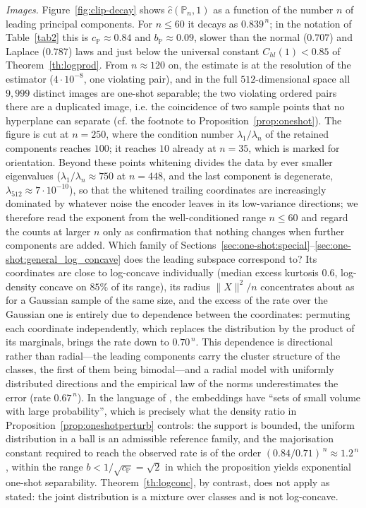 {\it Images.} Figure~\ref{fig:clip-decay} shows $\hat c({\mathbb P}_n,1)$ as a function of the number $n$ of leading principal components. For $n\le60$ it decays as $0.839^{\,n}$; in the notation of Table~\ref{tab2} this is $c_{\mathbb P}\approx0.84$ and $b_{\mathbb P}\approx0.09$, slower than the normal ($0.707$) and Laplace ($0.787$) laws and just below the universal constant $C_{hl}(1)<0.85$ of Theorem~\ref{th:logprod}. From $n\approx120$ on, the estimate is at the resolution of the estimator ($4\cdot10^{-8}$, one violating pair), and in the full $512$-dimensional space all $9{,}999$ distinct images are one-shot separable; the two violating ordered pairs there are a duplicated image, i.e. the coincidence of two sample points that no hyperplane can separate (cf. the footnote to Proposition~\ref{prop:oneshot}). The figure is cut at $n=250$, where the condition number $\lambda_1/\lambda_n$ of the retained components reaches $100$; it reaches $10$ already at $n=35$, which is marked for orientation. Beyond these points whitening divides the data by ever smaller eigenvalues ($\lambda_1/\lambda_n\approx750$ at $n=448$, and the last component is degenerate, $\lambda_{512}\approx7\cdot10^{-10}$), so that the whitened trailing coordinates are increasingly dominated by whatever noise the encoder leaves in its low-variance directions; we therefore read the exponent from the well-conditioned range $n\le60$ and regard the counts at larger $n$ only as confirmation that nothing changes when further components are added. Which family of Sections~\ref{sec:one-shot:special}--\ref{sec:one-shot:general_log_concave} does the leading subspace correspond to? Its coordinates are close to log-concave individually (median excess kurtosis $0.6$, log-density concave on $85\%$ of its range), its radius $\|X\|^2/n$ concentrates about as for a Gaussian sample of the same size, and the excess of the rate over the Gaussian one is entirely due to dependence between the coordinates: permuting each coordinate independently, which replaces the distribution by the product of its marginals, brings the rate down to $0.70^{\,n}$. This dependence is directional rather than radial---the leading components carry the cluster structure of the classes, the first of them being bimodal---and a radial model with uniformly distributed directions and the empirical law of the norms underestimates the error (rate $0.67^{\,n}$). In the language of \cite{grechuk2021general}, the embeddings have ``sets of small volume with large probability'', which is precisely what the density ratio in Proposition~\ref{prop:oneshotperturb} controls: the support is bounded, the uniform distribution in a ball is an admissible reference family, and the majorisation constant required to reach the observed rate is of the order $(0.84/0.71)^{\,n}\approx1.2^{\,n}$, within the range $b<1/\sqrt{c_{\mathbb P}}=\sqrt2$ in which the proposition yields exponential one-shot separability. Theorem~\ref{th:logconc}, by contrast, does not apply as stated: the joint distribution is a mixture over classes and is not log-concave.


